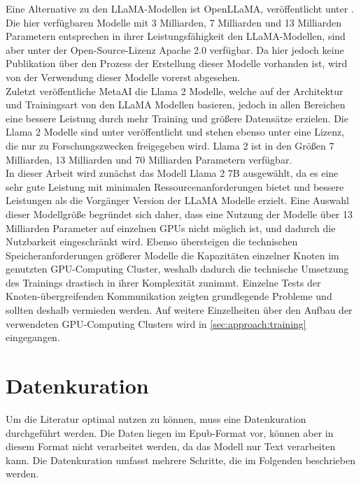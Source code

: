 Eine Alternative zu den LLaMA-Modellen ist OpenLLaMA, veröffentlicht unter \citet{openllama}.
Die hier verfügbaren Modelle mit 3 Milliarden, 7 Milliarden und 13 Milliarden Parametern entsprechen in ihrer Leistungsfähigkeit den LLaMA-Modellen, sind aber unter der Open-Source-Lizenz Apache 2.0 verfügbar. Da hier jedoch keine Publikation über den Prozess der Erstellung dieser Modelle vorhanden ist, wird von der Verwendung dieser Modelle vorerst abgesehen.\\

Zuletzt veröffentliche MetaAI die Llama 2 Modelle, welche auf der Architektur und Trainingsart von den LLaMA Modellen basieren, jedoch in allen Bereichen eine bessere Leistung durch mehr Training und größere Datensätze erzielen. Die Llama 2 Modelle sind unter \citet{llama2} veröffentlicht und stehen ebenso unter eine Lizenz, die nur zu Forschungszwecken freigegeben wird.
Llama 2 ist in den Größen 7 Milliarden, 13 Milliarden und 70 Milliarden Parametern verfügbar.\\

In dieser Arbeit wird zunächst das Modell Llama 2 7B ausgewählt, da es eine sehr gute Leistung mit minimalen Ressourcenanforderungen bietet und bessere Leistungen als die Vorgänger Version der LLaMA Modelle erzielt.
Eine Auswahl dieser Modellgröße begründet sich daher, dass eine Nutzung der Modelle über 13 Milliarden Parameter auf einzelnen GPUs nicht möglich ist, und dadurch die Nutzbarkeit eingeschränkt wird.
Ebenso übersteigen die technischen Speicheranforderungen größerer Modelle die Kapazitäten einzelner Knoten im genutzten GPU-Computing Cluster, weshalb dadurch die technische Umsetzung des Trainings drastisch in ihrer Komplexität zunimmt.
Einzelne Tests der Knoten-übergreifenden Kommunikation zeigten grundlegende Probleme und sollten deshalb vermieden werden.
Auf weitere Einzelheiten über den Aufbau der verwendeten GPU-Computing Clusters wird in \cref{sec:approach:training} eingegangen.\\

\section{Datenkuration}\label{sec:datenkuration}
Um die Literatur optimal nutzen zu können, muss eine Datenkuration durchgeführt werden.
Die Daten liegen im Epub-Format vor, können aber in diesem Format nicht verarbeitet werden, da das Modell nur Text verarbeiten kann.
Die Datenkuration umfasst mehrere Schritte, die im Folgenden beschrieben werden.\\

